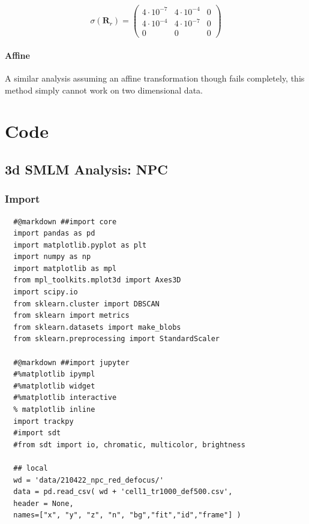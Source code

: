 \documentclass[11pt, a4paper, oneside, twocolumn]{report}
\renewcommand{\b}{\textbf}
\begin{document}
\begin{equation}
  \sigma( \b{R}_r ) =
  \begin{pmatrix}
    4\cdot10^{-7} & 4\cdot10^{-4} & 0 \\
    4\cdot10^{-4} & 4\cdot10^{-7} & 0 \\
    0 & 0 & 0
  \end{pmatrix}
\end{equation}


\subsubsection{Affine}

A similar analysis assuming an affine transformation though fails
completely, this method simply cannot work on two dimensional data.


\appendix


\chapter{Code}\label{ch:code}

\onecolumn


\section{3d SMLM Analysis: NPC}



\subsection{Import}

\begin{verbatim}
  #@markdown ##import core
  import pandas as pd
  import matplotlib.pyplot as plt
  import numpy as np
  import matplotlib as mpl
  from mpl_toolkits.mplot3d import Axes3D
  import scipy.io
  from sklearn.cluster import DBSCAN
  from sklearn import metrics
  from sklearn.datasets import make_blobs
  from sklearn.preprocessing import StandardScaler

  #@markdown ##import jupyter
  #%matplotlib ipympl
  #%matplotlib widget
  #%matplotlib interactive
  % matplotlib inline
  import trackpy
  #import sdt
  #from sdt import io, chromatic, multicolor, brightness
  
  ## local
  wd = 'data/210422_npc_red_defocus/'
  data = pd.read_csv( wd + 'cell1_tr1000_def500.csv',
  header = None,
  names=["x", "y", "z", "n", "bg","fit","id","frame"] )
\end{verbatim}
\end{document}
